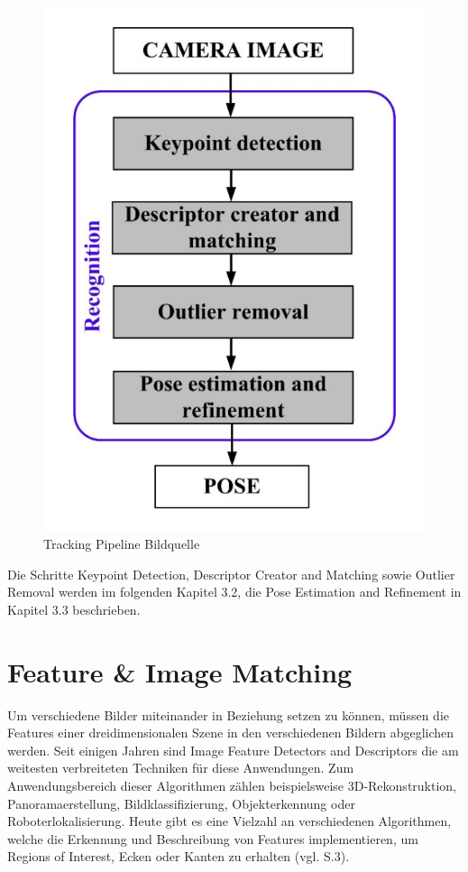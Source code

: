 \begin{figure}[H]
	\centering
	\includegraphics[scale=0.55]{tracking_pipeline.png}
	\caption{Tracking Pipeline Bildquelle \cite{natural_feature}}
\end{figure} 

Die Schritte \glqq Keypoint Detection\grqq{}, \glqq  Descriptor Creator and Matching\grqq{} sowie \glqq Outlier Removal\grqq{} werden im folgenden Kapitel 3.2, die \glqq Pose Estimation and Refinement\grqq{} in Kapitel 3.3 beschrieben.


\section{Feature \& Image Matching}

Um verschiedene Bilder miteinander in Beziehung setzen zu können, müssen die Features einer dreidimensionalen Szene in den verschiedenen Bildern abgeglichen werden. Seit einigen Jahren sind \glqq Image Feature Detectors and Descriptors\grqq{} die am weitesten verbreiteten Techniken für diese Anwendungen. Zum Anwendungsbereich dieser Algorithmen zählen beispielsweise 3D-Rekonstruktion, Panoramaerstellung, Bildklassifizierung, Objekterkennung oder Roboterlokalisierung. Heute gibt es eine Vielzahl an verschiedenen Algorithmen, welche die Erkennung und Beschreibung von Features implementieren, um \glqq Regions of Interest\grqq{}, Ecken oder Kanten zu erhalten (vgl. \cite{robust_feature} S.3).

